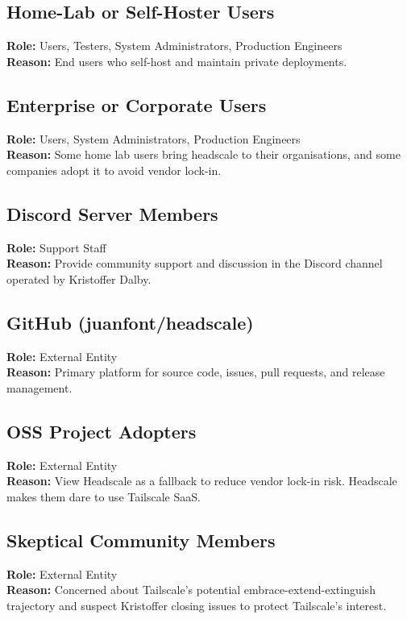 \documentclass[11pt, a4paper]{article}
\begin{document}
\subsection{Home-Lab or Self-Hoster Users}
\textbf{Role:} Users, Testers, System Administrators, Production Engineers \\
\textbf{Reason:} End users who self-host and maintain private deployments.

\subsection{Enterprise or Corporate Users}
\textbf{Role:} Users, System Administrators, Production Engineers \\
\textbf{Reason:} Some home lab users bring headscale to their organisations, and some companies adopt it to avoid vendor lock-in.

\subsection{Discord Server Members}
\textbf{Role:} Support Staff \\
\textbf{Reason:} Provide community support and discussion in the Discord channel operated by Kristoffer Dalby.

\subsection{GitHub (juanfont/headscale)}
\textbf{Role:} External Entity \\
\textbf{Reason:} Primary platform for source code, issues, pull requests, and release management.

\subsection{OSS Project Adopters}
\textbf{Role:} External Entity \\
\textbf{Reason:} View Headscale as a fallback to reduce vendor lock-in risk. Headscale makes them dare to use Tailscale SaaS.

\subsection{Skeptical Community Members}
\textbf{Role:} External Entity \\
\textbf{Reason:} Concerned about Tailscale's potential embrace-extend-extinguish trajectory and suspect Kristoffer closing issues to protect Tailscale's interest. 
\end{document}
